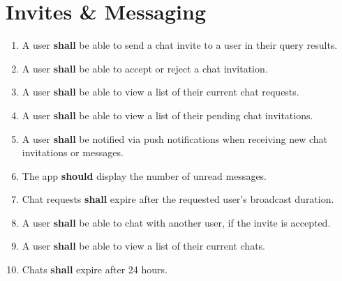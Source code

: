 \documentclass{article}
\begin{document}
\section*{Invites \& Messaging}
	\begin{enumerate}
		\setcounter{enumi}{\theenumTemp}
		\item A user \textbf{shall} be able to send a chat invite to a user in their query results.
		\item A user \textbf{shall} be able to accept or reject a chat invitation.
		\item A user \textbf{shall} be able to view a list of their current chat requests.
		\item A user \textbf{shall} be able to view a list of their pending chat invitations.
		\item A user \textbf{shall} be notified via push notifications when receiving new chat invitations or messages.
		\item The app \textbf{should} display the number of unread messages.
		\item Chat requests \textbf{shall} expire after the requested user's broadcast duration.
		\item A user \textbf{shall} be able to chat with another user, if the invite is accepted.
		\item A user \textbf{shall} be able to view a list of their current chats.
		\item Chats \textbf{shall} expire after 24 hours.
	\end{enumerate}
\end{document}
